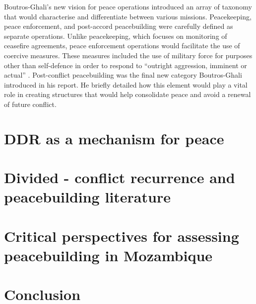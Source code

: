 Boutros-Ghali's new vision for peace operations introduced an array of taxonomy that would characterise and differentiate between various missions. Peacekeeping, peace enforcement, and post-accord peacebuilding were carefully defined as separate operations. Unlike peacekeeping, which focuses on monitoring of ceasefire agreements, peace enforcement operations would facilitate the use of coercive measures. These measures included the use of military force for purposes other than self-defence in order to respond to ``outright aggression, imminent or actual'' \citep[44]{ghali1992}. Post-conflict peacebuilding was the final new category Boutros-Ghali introduced in his report. He briefly detailed how this element would play a vital role in creating structures that would help consolidate peace and avoid a renewal of future conflict. 



\section{DDR as a mechanism for peace}





\section{Divided - conflict recurrence and peacebuilding literature}





\section{Critical perspectives for assessing peacebuilding in Mozambique}





\section{Conclusion}